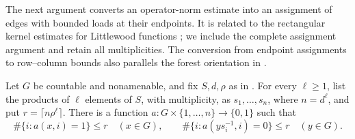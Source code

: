 The next argument converts an operator-norm estimate into an assignment
of edges with bounded loads at their endpoints. It is related to the
rectangular kernel estimates for Littlewood functions
\cite[Proposition~2.6]{GGMT2018}; we include the complete assignment
argument and retain all multiplicities. The conversion from endpoint
assignments to row--column bounds also parallels the forest orientation
in \cite[Propositions~2.3--2.4]{EpsteinMonod2009}.

\begin{proposition}\label{prop:sparse-splitting}
Let \(G\) be countable and nonamenable, and fix \(S,d,\rho\) as in
. For every \(\ell\ge1\), list the products
of \(\ell\) elements of \(S\), with multiplicity, as
\(s_1,\ldots,s_n\), where \(n=d^\ell\), and put
\(r=\lceil n\rho^\ell\rceil\). There is a function
\(a:G\times\{1,\ldots,n\}\to\{0,1\}\) such that
\begin{equation}\label{eq:sparse-mask}
 \#\{i:a(x,i)=1\}\le r\quad(x\in G),\qquad
 \#\{i:a(ys_i^{-1},i)=0\}\le r\quad(y\in G).
\end{equation}
\end{proposition}

